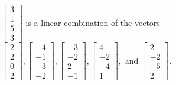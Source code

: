 \begin{exercise}
\begin{exerciseStatement}
  \end{exerciseStatement}
  \begin{exerciseAnswer}
   \(\left[\begin{array}{c}
3 \\
1 \\
5 \\
3
\end{array}\right]\) 
  	 is  
	a linear combination of the vectors \(\left[\begin{array}{c}
2 \\
2 \\
0 \\
2
\end{array}\right] , \left[\begin{array}{c}
-4 \\
-1 \\
-3 \\
-2
\end{array}\right] , \left[\begin{array}{c}
-3 \\
-2 \\
2 \\
-1
\end{array}\right] , \left[\begin{array}{c}
4 \\
-2 \\
-4 \\
1
\end{array}\right] , \text{ and } \left[\begin{array}{c}
2 \\
-2 \\
-5 \\
2
\end{array}\right]\).

	
  


  \end{exerciseAnswer}
\end{exercise}